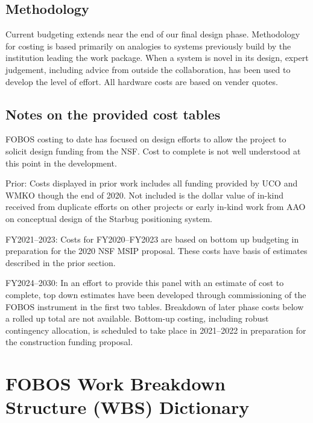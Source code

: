 \documentclass[oneside,11pt]{amsart}
\begin{document}
\subsection{Methodology}

Current budgeting extends near the end of our final design phase.
Methodology for costing is based primarily on analogies to systems
previously build by the institution leading the work package. When a
system is novel in its design, expert judgement, including advice
from outside the collaboration, has been used to develop the level of
effort. All hardware costs are based on vender quotes.

\subsection{Notes on the provided cost tables}

FOBOS costing to date has focused on design efforts to allow the
project to solicit design funding from the NSF. Cost to complete is
not well understood at this point in the development.

\noindent Prior: Costs displayed in prior work includes all funding
provided by UCO and WMKO though the end of 2020. Not included is the
dollar value of in-kind received from duplicate efforts on other
projects or early in-kind work from AAO on conceptual design of the
Starbug positioning system.

\noindent FY2021--2023: Costs for FY2020--FY2023 are based on
bottom up budgeting in preparation for the 2020 NSF MSIP proposal.
These costs have basis of estimates described in the prior section.

\noindent FY2024--2030: In an effort to provide this panel with an
estimate of cost to complete, top down estimates have been developed
through commissioning of the FOBOS instrument in the first two
tables. Breakdown of later phase costs below a rolled up total are
not available. Bottom-up costing, including robust contingency
allocation, is scheduled to take place in 2021--2022 in preparation
for the construction funding proposal.


\begin{multicols}{2}
\scriptsize


\end{multicols}

\newpage

\setcounter{page}{1}
\section*{FOBOS Work Breakdown Structure (WBS) Dictionary}
\end{document}
